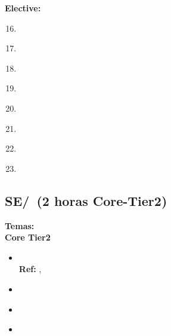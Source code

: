 \noindent \textbf{Elective:}
\begin{enumerate}
	\setcounter{enumi}{15}
	\item \SESoftwareDesignLODiscussAnd\xspace[\SESoftwareDesignLODiscussAndLevel]\label{sec:BOK:SESoftwareDesignLODiscussAnd}
	\item \SESoftwareDesignLOApplyModels\xspace[\SESoftwareDesignLOApplyModelsLevel]\label{sec:BOK:SESoftwareDesignLOApplyModels}
	\item \SESoftwareDesignLOAnalyzeAFrom\xspace[\SESoftwareDesignLOAnalyzeAFromLevel]\label{sec:BOK:SESoftwareDesignLOAnalyzeAFrom}
	\item \SESoftwareDesignLOAnalyzeAFromOf\xspace[\SESoftwareDesignLOAnalyzeAFromOfLevel]\label{sec:BOK:SESoftwareDesignLOAnalyzeAFromOf}
	\item \SESoftwareDesignLOExplainTheObjects\xspace[\SESoftwareDesignLOExplainTheObjectsLevel]\label{sec:BOK:SESoftwareDesignLOExplainTheObjects}
	\item \SESoftwareDesignLOApplyComponent\xspace[\SESoftwareDesignLOApplyComponentLevel]\label{sec:BOK:SESoftwareDesignLOApplyComponent}
	\item \SESoftwareDesignLORefactorAn\xspace[\SESoftwareDesignLORefactorAnLevel]\label{sec:BOK:SESoftwareDesignLORefactorAn}
	\item \SESoftwareDesignLOStateAnd\xspace[\SESoftwareDesignLOStateAndLevel]\label{sec:BOK:SESoftwareDesignLOStateAnd}
\end{enumerate}


\subsection{SE/\SESoftwareConstruction~(2 horas Core-Tier2)}\label{sec:BOK:SESoftwareConstruction}
\noindent \textbf{Temas:}\\
\noindent \textbf{Core Tier2}
\begin{itemize}
	\item \SESoftwareConstructionTopicCoding\xspace \\ \textbf{Ref:} , \label{sec:BOK:SESoftwareConstructionTopicCoding}
	\item \SESoftwareConstructionTopicCodingStandards\label{sec:BOK:SESoftwareConstructionTopicCodingStandards}
	\item \SESoftwareConstructionTopicIntegration\label{sec:BOK:SESoftwareConstructionTopicIntegration}
	\item \SESoftwareConstructionTopicDevelopment\label{sec:BOK:SESoftwareConstructionTopicDevelopment}
\end{itemize}


